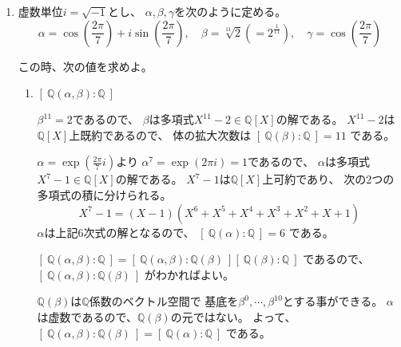 \documentclass[12pt,b5paper]{ltjsarticle}
\begin{document}
\hrulefill

\begin{enumerate}
 \item
      虚数単位$i=\sqrt{-1}$とし、
      $\alpha,\beta,\gamma$を次のように定める。
      \begin{equation}
       \alpha = \cos\left(\frac{2\pi}{7}\right)
                + i\sin\left(\frac{2\pi}{7}\right)
        ,\quad
        \beta = \sqrt[11]{2} \left( = 2^{\frac{1}{11}}\right)
        ,\quad
        \gamma = \cos\left(\frac{2\pi}{7}\right)
      \end{equation}

      この時、次の値を求めよ。
      \begin{enumerate}
       \item
            $\left[ \: \mathbb{Q}(\alpha,\beta):\mathbb{Q} \: \right]$

            \dotfill

            $\beta^{11}=2$であるので、
            $\beta$は多項式$X^{11}-2 \in \mathbb{Q}[X]$の解である。
            $X^11-2$は$\mathbb{Q}[X]$上既約であるので、
            体の拡大次数は
            $\left[ \: \mathbb{Q}(\beta):\mathbb{Q} \: \right] = 11$
            である。

            $\alpha = \exp{\left( \frac{2\pi}{7}i \right)}$より
            $\alpha^{7} = \exp{\left( 2\pi i\right)} = 1$であるので、
            $\alpha$は多項式$X^7-1\in\mathbb{Q}[X]$の解である。
            $X^7-1$は$\mathbb{Q}[X]$上可約であり、
            次の2つの多項式の積に分けられる。
            \begin{equation}
             X^7-1 = (X-1) (X^6 + X^5 + X^4 + X^3 + X^2 + X + 1 )
            \end{equation}
            $\alpha$は上記$6$次式の解となるので、
            $\left[ \: \mathbb{Q}(\alpha):\mathbb{Q} \: \right] = 6$
            である。

            $\left[ \: \mathbb{Q}(\alpha,\beta):\mathbb{Q} \: \right]
            =
            \left[ \: \mathbb{Q}(\alpha,\beta):\mathbb{Q}(\beta) \: \right]
            \left[ \: \mathbb{Q}(\beta):\mathbb{Q} \: \right]$
            であるので、
            $\left[ \: \mathbb{Q}(\alpha,\beta):\mathbb{Q}(\beta) \: \right]$
            がわかればよい。

            $\mathbb{Q}(\beta)$は$\mathbb{Q}$係数のベクトル空間で
            基底を$\beta^{0},\cdots,\beta^{10}$とする事ができる。
            $\alpha$は虚数であるので、$\mathbb{Q}(\beta)$の元ではない。
            よって、
            $\left[ \: \mathbb{Q}(\alpha,\beta):\mathbb{Q}(\beta) \: \right]
            =\left[ \: \mathbb{Q}(\alpha):\mathbb{Q} \: \right]$
            である。


\end{enumerate}
\end{enumerate}
\end{document}
